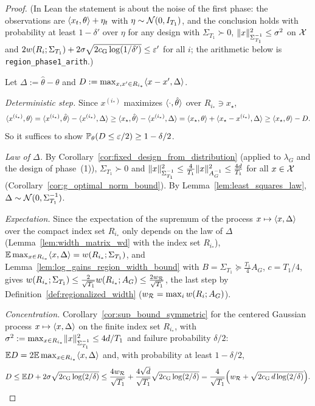 \begin{proof}
\leanok
{}
(In Lean the statement is about the noise of the first phase: the observations are
$\langle x_t, \theta \rangle + \eta_t$ with $\eta \sim \mathcal{N}(0, I_{T_1})$, and the conclusion holds with
probability at least $1 - \delta'$ over $\eta$ for any design with $\Sigma_{T_1} \succ 0$,
$\lVert x \rVert^2_{\Sigma_{T_1}^{-1}} \le \sigma^2$ on $\mathcal{X}$ and
$2w(R_i;\Sigma_{T_1}) + 2\sigma\sqrt{2c_{\mathrm{G}}\log(1/\delta')} \le \varepsilon'$ for all $i$;
the arithmetic below is \texttt{region\_phase1\_arith}.)

Let $\Delta := \hat\theta - \theta$ and $D := \max_{x,x'\in R_{i_*}}\langle x-x', \Delta \rangle$.

\emph{Deterministic step.} Since $x^{(i_*)}$ maximizes $\langle \cdot, \hat\theta \rangle$ over
$R_{i_*} \ni x_\star$,
\[
  \langle x^{(i_*)}, \theta \rangle = \langle x^{(i_*)}, \hat\theta \rangle - \langle x^{(i_*)}, \Delta \rangle
  \ge \langle x_\star, \hat\theta \rangle - \langle x^{(i_*)}, \Delta \rangle
  = \langle x_\star, \theta \rangle + \langle x_\star - x^{(i_*)}, \Delta \rangle \ge \langle x_\star, \theta \rangle - D .
\]
So it suffices to show $\mathbb{P}_\theta(D \le \varepsilon/2) \ge 1 - \delta/2$.

\emph{Law of $\Delta$.} By Corollary~\ref{cor:fixed_design_from_distribution} (applied to
$\lambda_G$ and the design of phase~(1)), $\Sigma_{T_1} \succ 0$ and
$\lVert x \rVert^2_{\Sigma_{T_1}^{-1}} \le \frac{4}{T_1}\lVert x \rVert^2_{A_G^{-1}} \le \frac{4d}{T_1}$ for
all $x \in \mathcal{X}$ (Corollary~\ref{cor:g_optimal_norm_bound}). By
Lemma~\ref{lem:least_squares_law}, $\Delta \sim \mathcal{N}(0, \Sigma_{T_1}^{-1})$.

\emph{Expectation.} Since the expectation of the supremum of the process
$x \mapsto \langle x, \Delta \rangle$ over the compact index set $R_{i_*}$ only depends on the law of
$\Delta$ (Lemma~\ref{lem:width_matrix_wd} with the index set $R_{i_*}$),
$\mathbb{E}\max_{x\in R_{i_*}}\langle x, \Delta \rangle = w(R_{i_*};\Sigma_{T_1})$, and
Lemma~\ref{lem:log_gains_region_width_bound} with $B = \Sigma_{T_1} \succeq \frac{T_1}{4}A_G$,
$c = T_1/4$, gives
$w(R_{i_*};\Sigma_{T_1}) \le \frac{2}{\sqrt{T_1}}w(R_{i_*};A_G)
\le \frac{2 w_{\mathcal R}}{\sqrt{T_1}}$, the last step by Definition~\ref{def:regionalized_width}
($w_{\mathcal R} = \max_iw(R_i;A_G)$).

\emph{Concentration.} Corollary~\ref{cor:sup_bound_symmetric} for the centered Gaussian
process $x \mapsto \langle x, \Delta \rangle$ on the finite index set $R_{i_*}$, with
$\sigma^2 := \max_{x\in R_{i_*}}\lVert x \rVert^2_{\Sigma_{T_1}^{-1}} \le 4d/T_1$ and failure
probability $\delta/2$: $\mathbb{E} D = 2\mathbb{E}\max_{x\in R_{i_*}}\langle x, \Delta \rangle$ and, with probability at
least $1 - \delta/2$,
\[
  D \le \mathbb{E} D + 2\sigma\sqrt{2c_{\mathrm{G}}\log(2/\delta)}
  \le \frac{4 w_{\mathcal R}}{\sqrt{T_1}} + \frac{4\sqrt d}{\sqrt{T_1}}\sqrt{2c_{\mathrm{G}}\log(2/\delta)}
  = \frac{4}{\sqrt{T_1}}\Big(w_{\mathcal R} + \sqrt{2c_{\mathrm{G}}\,d\log(2/\delta)}\Big).
\]


\end{proof}
